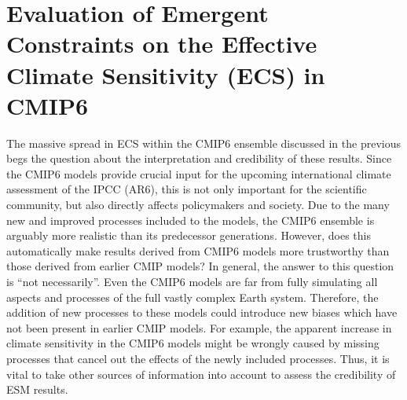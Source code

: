 
%



\chapter{Evaluation of Emergent Constraints on the Effective Climate
  Sensitivity (\acs{ECS}) in \acs{CMIP}6}
\label{ch:05:paper_ecs}

The massive spread in \ac{ECS} within the \acs{CMIP}6 ensemble discussed in the
previous  begs the question about the
interpretation and credibility of these results. Since the \acs{CMIP}6 models
provide crucial input for the upcoming international climate assessment of the
\ac{IPCC} (\acs{AR}6), this is not only important for the scientific community,
but also directly affects policymakers and society. Due to the many new and
improved processes included to the models, the \acs{CMIP}6 ensemble is arguably
more realistic than its predecessor generations. However, does this
automatically make results derived from \acs{CMIP}6 models more trustworthy
than those derived from earlier \ac{CMIP} models? In general, the answer to
this question is \enquote{not necessarily}. Even the \acs{CMIP}6 models are far
from fully simulating all aspects and processes of the full vastly complex
Earth system. Therefore, the addition of new processes to these models could
introduce new biases which have not been present in earlier \ac{CMIP} models.
For example, the apparent increase in climate sensitivity in the \acs{CMIP}6
models might be wrongly caused by missing processes that cancel out the effects
of the newly included processes. Thus, it is vital to take other sources of
information into account to assess the credibility of \ac{ESM} results.

